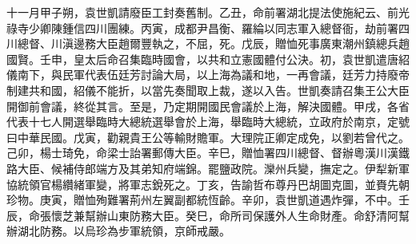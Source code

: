 \begin{pinyinscope}
十一月甲子朔，袁世凱請廢臣工封奏舊制。乙丑，命前署湖北提法使施紀云、前光祿寺少卿陳鍾信四川團練。丙寅，成都尹昌衡、羅綸以同志軍入總督衙，劫前署四川總督、川滇邊務大臣趙爾豐執之，不屈，死。戊辰，贈恤死事廣東潮州鎮總兵趙國賢。壬申，皇太后命召集臨時國會，以共和立憲國體付公決。初，袁世凱遣唐紹儀南下，與民軍代表伍廷芳討論大局，以上海為議和地，一再會議，廷芳力持廢帝制建共和國，紹儀不能折，以當先奏聞取上裁，遂以入告。世凱奏請召集王公大臣開御前會議，終從其言。至是，乃定期開國民會議於上海，解決國體。甲戌，各省代表十七人開選舉臨時大總統選舉會於上海，舉臨時大總統，立政府於南京，定號曰中華民國。戊寅，勸親貴王公等輸財贍軍。大理院正卿定成免，以劉若曾代之。己卯，楊士琦免，命梁士詒署郵傳大臣。辛巳，贈恤署四川總督、督辦粵漢川漢鐵路大臣、候補侍郎端方及其弟知府端錦。罷鹽政院。灤州兵變，撫定之。伊犁新軍協統領官楊纘緒軍變，將軍志銳死之。丁亥，告諭哲布尊丹巴胡圖克圖，並賚先朝珍物。庚寅，贈恤殉難署荊州左翼副都統恆齡。辛卯，袁世凱道遇炸彈，不中。壬辰，命張懷芝兼幫辦山東防務大臣。癸巳，命所司保護外人生命財產。命舒清阿幫辦湖北防務。以烏珍為步軍統領，京師戒嚴。


\end{pinyinscope}

